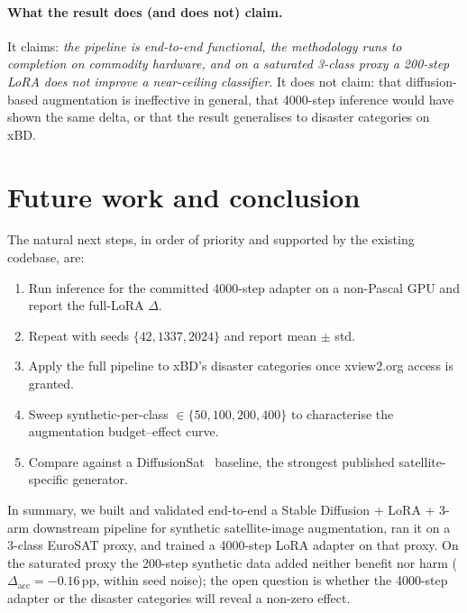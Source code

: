 \documentclass[12pt,a4paper]{article}
\begin{document}
\paragraph{What the result does (and does not) claim.} It claims:
\emph{the pipeline is end-to-end functional, the methodology runs to
completion on commodity hardware, and on a saturated 3-class proxy a
200-step LoRA does not improve a near-ceiling classifier.} It does not
claim: that diffusion-based augmentation is ineffective in general,
that 4000-step inference would have shown the same delta, or that the
result generalises to disaster categories on xBD.

\section{Future work and conclusion}
\label{sec:future}

The natural next steps, in order of priority and supported by the
existing codebase, are:
\begin{enumerate}
\setlength\itemsep{-0.1em}
\item Run inference for the committed 4000-step adapter on a non-Pascal
      GPU and report the full-LoRA $\Delta$.
\item Repeat with seeds $\{42, 1337, 2024\}$ and report mean $\pm$ std.
\item Apply the full pipeline to xBD's disaster categories once
      xview2.org access is granted.
\item Sweep synthetic-per-class $\in \{50, 100, 200, 400\}$ to
      characterise the augmentation budget--effect curve.
\item Compare against a DiffusionSat~\cite{khanna2023diffusionsat}
      baseline, the strongest published satellite-specific generator.
\end{enumerate}

In summary, we built and validated end-to-end a Stable Diffusion +
LoRA + 3-arm downstream pipeline for synthetic satellite-image
augmentation, ran it on a 3-class EuroSAT proxy, and trained a 4000-step
LoRA adapter on that proxy. On the saturated proxy the 200-step
synthetic data added neither benefit nor harm
($\Delta_\text{acc} = -0.16$\,pp, within seed noise); the open question
is whether the 4000-step adapter or the disaster categories will reveal
a non-zero effect.

\printbibliography[heading=bibintoc,title={References}]
\end{document}
